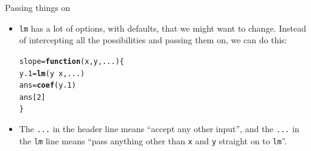 \documentclass[unknownkeysallowed]{beamer}\usepackage[]{graphicx}\usepackage[]{color}
\makeatletter
\newcommand{\hlnum}[1]{\textcolor[rgb]{0.686,0.059,0.569}{#1}}%
\newcommand{\hlopt}[1]{\textcolor[rgb]{0,0,0}{#1}}%
\newcommand{\hlstd}[1]{\textcolor[rgb]{0.345,0.345,0.345}{#1}}%
\newcommand{\hlkwa}[1]{\textcolor[rgb]{0.161,0.373,0.58}{\textbf{#1}}}%
\newcommand{\hlkwb}[1]{\textcolor[rgb]{0.69,0.353,0.396}{#1}}%
\newcommand{\hlkwc}[1]{\textcolor[rgb]{0.333,0.667,0.333}{#1}}%
\newcommand{\hlkwd}[1]{\textcolor[rgb]{0.737,0.353,0.396}{\textbf{#1}}}%
\newenvironment{kframe}{%
 \def\at@end@of@kframe{}%
 \ifinner\ifhmode%
  \def\at@end@of@kframe{\end{minipage}}%
  \begin{minipage}{\columnwidth}%
 \fi\fi%
 \def\FrameCommand##1{\hskip\@totalleftmargin \hskip-\fboxsep
 \colorbox{shadecolor}{##1}\hskip-\fboxsep
     \hskip-\linewidth \hskip-\@totalleftmargin \hskip\columnwidth}%
 \MakeFramed {\advance\hsize-\width
   \@totalleftmargin\z@ \linewidth\hsize
   \@setminipage}}%
 {\par\unskip\endMakeFramed%
 \at@end@of@kframe}
\newenvironment{knitrout}{}{} %
\makeatother
\begin{document}
\begin{frame}[fragile]{Passing things on}
  
  \begin{itemize}
  \item \texttt{lm} has  a lot of options, with defaults, that we
    might want to change. Instead of intercepting all the
    possibilities and passing them on, we can do this:
    
\begin{knitrout}
\color{fgcolor}\begin{kframe}
\begin{alltt}
\hlstd{slope}\hlkwb{=}\hlkwa{function}\hlstd{(}\hlkwc{x}\hlstd{,}\hlkwc{y}\hlstd{,}\hlkwc{...}\hlstd{) \{}
  \hlstd{y.1}\hlkwb{=}\hlkwd{lm}\hlstd{(y}\hlopt{~}\hlstd{x,...)}
  \hlstd{ans}\hlkwb{=}\hlkwd{coef}\hlstd{(y.1)}
  \hlstd{ans[}\hlnum{2}\hlstd{]}
\hlstd{\}}
\end{alltt}
\end{kframe}
\end{knitrout}
\item The \texttt{...} in the header line means ``accept any other
  input'', and the \texttt{...} in the \texttt{lm} line means ``pass
  anything other than \texttt{x} and \texttt{y} straight on to \texttt{lm}''. 
    
  \end{itemize}
  
\end{frame}
\end{document}
